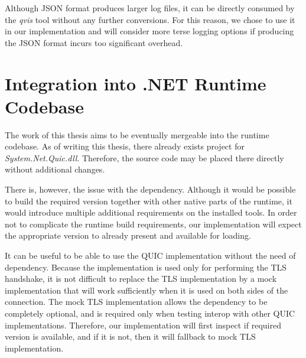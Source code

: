 Although JSON format produces larger log files, it can be directly consumed by the \textit{qvis}
tool without any further conversions. For this reason, we chose to use it in our implementation and
will consider more  terse logging options if producing the JSON format incurs too significant
overhead.

\section{Integration into .NET Runtime Codebase}

The work of this thesis aims to be eventually mergeable into the \dotnet{} runtime codebase. As of
writing this thesis, there already exists project for \textit{System.Net.Quic.dll}. Therefore, the
source code may be placed there directly without additional changes.

There is, however, the issue with the \libopenssl{} dependency. Although it would be possible to
build the required \libopenssl{} version together with other native parts of the \dotnet{} runtime,
it would introduce multiple additional requirements on the installed tools. In order not to
complicate the runtime build requirements, our implementation will expect the appropriate
\libopenssl{} version to already present and available for loading.

It can be useful to be able to use the QUIC implementation without the need of \libopenssl{}
dependency. Because the \libopenssl{} implementation is used only for performing the TLS handshake,
it is not difficult to replace the TLS implementation by a mock implementation that will work
sufficiently when it is used on both sides of the connection. The mock TLS implementation allows the
\libopenssl{} dependency to be completely optional, and is required only when testing interop with
other QUIC implementations. Therefore, our implementation will first inspect if required
\libopenssl{} version is available, and if it is not, then it will fallback to mock TLS
implementation.
